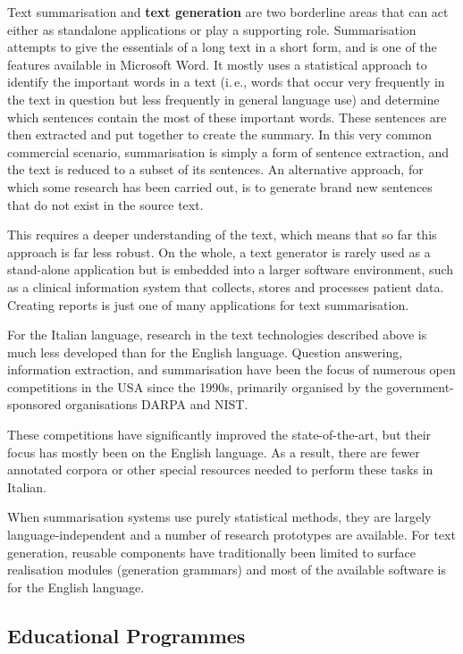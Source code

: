 \begin{multicols}{2}
Text summarisation and \textbf{text generation} are two borderline areas
that can act either as standalone applications or play a supporting
role. Summarisation attempts to give the essentials of a long text in a short
form, and is one of the features available in Microsoft Word. It mostly uses a
statistical approach to identify the important words in a text (i.\,e.,
words that occur very frequently in the text in question but less frequently
in general language use) and determine which sentences contain the most of
these important words. These sentences are then extracted and put
together to create the summary.  In this very common commercial scenario, summarisation is simply a form of sentence extraction, and the text is reduced to a subset of its sentences. An alternative approach, for which some research has been carried out, is to generate brand new sentences that do not exist in the source text. 

 

This requires a deeper understanding of the text, which means that so
far this approach is far less robust. On the whole, a text generator
is rarely used as a stand-alone application but is embedded into a
larger software environment, such as a clinical information system
that collects, stores and processes patient data. Creating reports is
just one of many applications for text summarisation. 

For the Italian language, research in the text technologies described
above is much less developed than for the English language. Question
answering, information extraction, and summarisation have been the
focus of numerous open competitions in the USA since the 1990s,
primarily organised by the government-sponsored organisations DARPA
and NIST. 

These competitions have significantly improved the state-of-the-art,
but their focus has mostly been on the English language. As a result,
there are fewer annotated corpora or other special resources needed to
perform these tasks in Italian. 

When summarisation systems use purely statistical methods, they are largely language-independent and a number of research prototypes are available. For text generation, reusable components have traditionally been limited to surface realisation modules (generation grammars) and most of the available software is for the English language.


\subsection{Educational Programmes}


\end{multicols}
